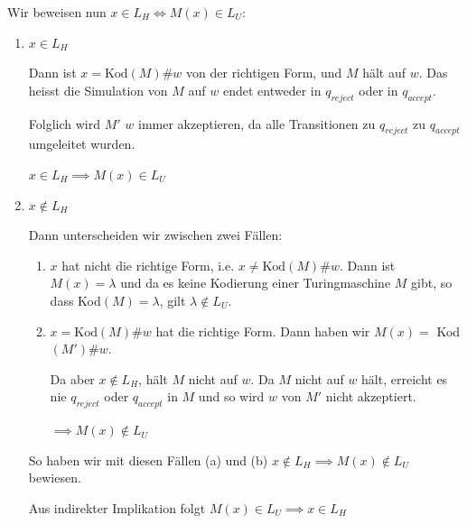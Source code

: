 \documentclass[a4paper, 11pt]{article}
\begin{document}
                    
                Wir beweisen nun $x \in L_H \iff M(x) \in L_U$:
            
                    \begin{enumerate}[label=(\roman*)]
                        \item $x \in L_H$
            
                            Dann ist $x = \text{Kod}(M)\#w$ von der richtigen Form, und $M$ hält auf $w$. 
                            Das heisst die Simulation von $M$ auf $w$ endet entweder in $q_{reject}$ oder in $q_{accept}$. 
                            
                            Folglich wird $M'$ $w$ immer akzeptieren, da alle Transitionen zu $q_{reject}$ zu $q_{accept}$ umgeleitet wurden. 
                            
                            $x \in L_H \implies M(x) \in L_U$
            
                        \item $x \notin L_H$
            
                            Dann unterscheiden wir zwischen zwei Fällen:
            
                            \begin{enumerate}[label=(\alph*)]
                                \item 
                                
                                $x$ hat nicht die richtige Form, i.e. $x \neq \text{Kod}(M)\#w$.
                                Dann ist $M(x) = \lambda$ und da es keine Kodierung einer Turingmaschine $M$ gibt, so dass Kod$(M) = \lambda$, gilt   $\lambda \notin L_U$.
                        
            
               
                \item
            
                                $x = \text{Kod}(M)\#w$ hat die richtige Form. Dann haben wir $M(x) = $ Kod$(M')\#w$.
                                
                                Da aber $x \notin L_H$, hält $M$ nicht auf $w$. Da $M$ nicht auf $w$ hält, erreicht es nie $q_{reject}$ oder $q_{accept}$ in $M$ und so wird $w$ von $M'$ nicht akzeptiert. 
            
                                $\implies M(x) \notin L_U$
            
                               
                                
                                
                            \end{enumerate}
                            
                             So haben wir mit diesen Fällen (a) und (b) $x \notin L_H \implies M(x) \notin L_U$ bewiesen. 
                             
                             Aus indirekter Implikation folgt $M(x) \in L_U \implies x \in L_H$
                                 
                    \end{enumerate}
            
\end{document}
